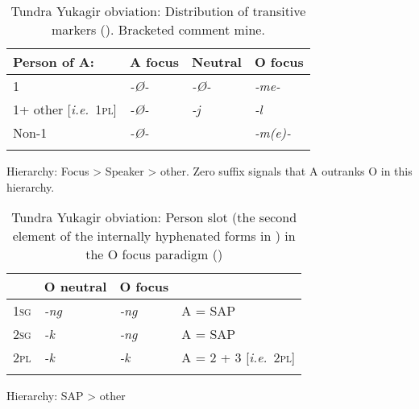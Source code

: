 \documentclass[output=collectionpaper]{langsci/langscibook}
\begin{document}
\begin{table}
\caption{Tundra Yukagir obviation: Distribution of transitive markers (\citealt[17]{Maslov2003}). Bracketed comment mine.}
\label{extab:Nich:18}

\begin{tabularx}{\textwidth}{XXXl}
\lsptoprule
	Person of A: &		A focus &	Neutral &		O focus	 \\
			 \midrule
	1	 & 	\itshape 	-Ø-	  &	 \itshape  -Ø-	  & \itshape 	-me- \\
	1+ other [\textit{i.e.}\ \textsc{1pl}] &	\itshape -Ø-	 &\itshape 	  -j	 &  \itshape 	-l \\
	Non-1 &		\itshape 	-Ø-	 & &		 \itshape 	 -m(e)- \\
\lspbottomrule
\end{tabularx}
\parbox{\textwidth}{\footnotesize	 Hierarchy:  Focus > Speaker > other. Zero suffix signals that A outranks O in this hierarchy. }
\end{table}


\begin{table}
\caption{Tundra Yukagir obviation: Person slot (the second element of the internally hyphenated forms in ) in the O focus paradigm (\citealt[20]{Maslov2003})}
\label{extab:Nich:19}

\begin{tabularx}{\textwidth}{lXXl}
\lsptoprule
		 & O neutral &	O focus & \\
			 \midrule
	\textsc{1sg} & 	\itshape  -ng &	    \itshape   	 -ng &				A = SAP\\ \cline{2-2}
	\textsc{2sg}  &	\itshape  -k  &	\multicolumn{1}{|l}{\itshape -ng}	 &			A = SAP	\\ \cline{3-3}
	\textsc{2pl} &	\itshape  -k &	 \itshape 	 -k	 &			A = 2 + 3	[\textit{i.e.}\ \textsc{2pl}] \\ \cline{2-3}
	\lspbottomrule
\end{tabularx}
\parbox{\textwidth}{\footnotesize Hierarchy: SAP > other}
\end{table}
\end{document}
